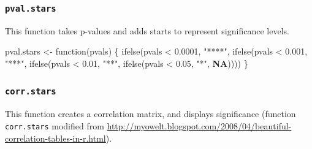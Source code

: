 \documentclass[
  bookmarksnumbered]{article}
\newenvironment{Shaded}{\begin{snugshade}}{\end{snugshade}}
\newcommand{\ConstantTok}[1]{\textcolor[rgb]{0.86,0.64,0.64}{\textbf{#1}}}
\newcommand{\ControlFlowTok}[1]{\textcolor[rgb]{0.94,0.87,0.69}{#1}}
\newcommand{\FloatTok}[1]{\textcolor[rgb]{0.75,0.75,0.82}{#1}}
\newcommand{\FunctionTok}[1]{\textcolor[rgb]{0.94,0.94,0.56}{#1}}
\newcommand{\NormalTok}[1]{\textcolor[rgb]{0.80,0.80,0.80}{#1}}
\newcommand{\OtherTok}[1]{\textcolor[rgb]{0.94,0.94,0.56}{#1}}
\newcommand{\SpecialCharTok}[1]{\textcolor[rgb]{0.86,0.64,0.64}{#1}}
\newcommand{\StringTok}[1]{\textcolor[rgb]{0.80,0.58,0.58}{#1}}
\begin{document}
\hypertarget{pval.stars}{%
\subsubsection{\texorpdfstring{\texttt{pval.stars}}{pval.stars}}\label{pval.stars}}

This function takes p-values and adds starts to represent significance levels.

\begin{Shaded}
\begin{Highlighting}[]
\NormalTok{pval.stars }\OtherTok{\textless{}{-}} \ControlFlowTok{function}\NormalTok{(pvals) \{}
  \FunctionTok{ifelse}\NormalTok{(pvals }\SpecialCharTok{\textless{}} \FloatTok{0.0001}\NormalTok{,}
         \StringTok{"****"}\NormalTok{,}
         \FunctionTok{ifelse}\NormalTok{(pvals }\SpecialCharTok{\textless{}} \FloatTok{0.001}\NormalTok{,}
                \StringTok{"***"}\NormalTok{,}
                \FunctionTok{ifelse}\NormalTok{(pvals }\SpecialCharTok{\textless{}} \FloatTok{0.01}\NormalTok{,}
                \StringTok{"**"}\NormalTok{,}
                       \FunctionTok{ifelse}\NormalTok{(pvals }\SpecialCharTok{\textless{}} \FloatTok{0.05}\NormalTok{,}
                       \StringTok{"*"}\NormalTok{, }\ConstantTok{NA}\NormalTok{))))}
\NormalTok{\}}
\end{Highlighting}
\end{Shaded}

\hypertarget{corr.stars}{%
\subsubsection{\texorpdfstring{\texttt{corr.stars}}{corr.stars}}\label{corr.stars}}

This function creates a correlation matrix, and displays significance (function \texttt{corr.stars} modified from \url{http://myowelt.blogspot.com/2008/04/beautiful-correlation-tables-in-r.html}).
\end{document}
